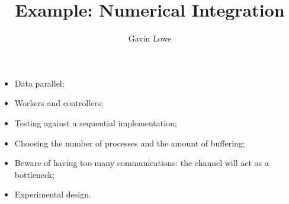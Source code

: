 \documentclass[notes,color]{sepslide0}
\title{Example: Numerical Integration}
\author{Gavin Lowe}
\begin{document}
\begin{slide}
  
  \Title

\end{slide}





\begin{slide}

\begin{itemize}
\item
Data parallel;

\item
Workers and controllers;


\item
Testing against a sequential implementation;

\item
Choosing the number of processes and the amount of buffering;

\item
Beware of having too many communications: the channel will act as a bottleneck;

\item
Experimental design.
\end{itemize}
\end{slide}
\end{document}
